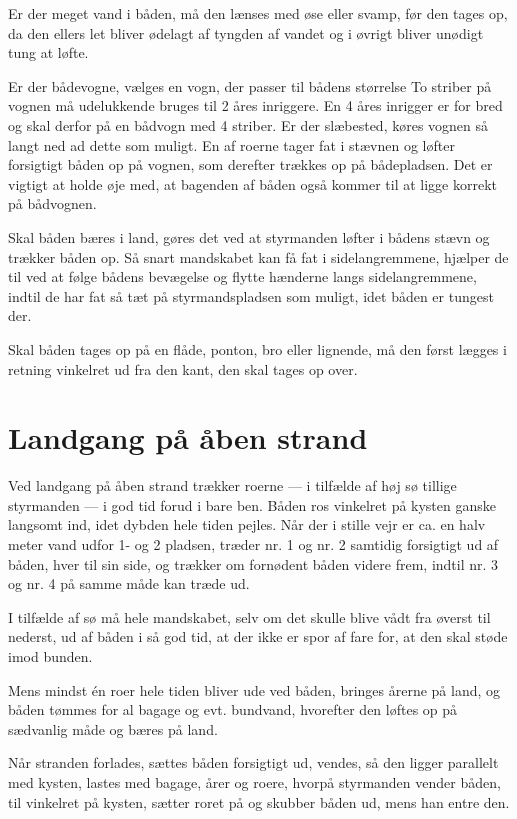 \documentclass{article}
\begin{document}
Er der meget vand i båden, må den lænses med øse eller svamp, før den
tages op, da den ellers let bliver ødelagt af tyngden af vandet og i
øvrigt bliver unødigt tung at løfte.

Er der bådevogne, vælges en vogn, der passer til bådens størrelse To
striber på vognen må udelukkende bruges til 2 åres inriggere. En 4 åres
inrigger er for bred og skal derfor på en bådvogn med 4 striber. Er der
slæbested, køres vognen så langt ned ad dette som muligt. En af roerne
tager fat i stævnen og løfter forsigtigt båden op på vognen, som derefter
trækkes op på bådepladsen. Det er vigtigt at holde øje med, at bagenden
af båden også kommer til at ligge korrekt på bådvognen.

Skal båden bæres i land, gøres det ved at styrmanden løfter i bådens
stævn og trækker båden op. Så snart mandskabet kan få fat i
sidelangremmene, hjælper de til ved at følge bådens bevægelse og flytte
hænderne langs sidelangremmene, indtil de har fat så tæt på
styrmandspladsen som muligt, idet båden er tungest der.

Skal båden tages op på en flåde, ponton, bro eller lignende, må den først
lægges i retning vinkelret ud fra den kant, den skal tages op over.

\section{Landgang på åben strand}

Ved landgang på åben strand trækker roerne --- i tilfælde af høj sø
tillige styrmanden --- i god tid forud i bare ben. Båden ros vinkelret på
kysten ganske langsomt ind, idet dybden hele tiden pejles. Når der i
stille vejr er ca. en halv meter vand udfor 1- og 2 pladsen, træder nr. 1
og nr. 2 samtidig forsigtigt ud af båden, hver til sin side, og trækker
om fornødent båden videre frem, indtil nr. 3 og nr. 4 på samme måde kan
træde ud.

I tilfælde af sø må hele mandskabet, selv om det skulle blive vådt fra
øverst til nederst, ud af båden i så god tid, at der ikke er spor af fare
for, at den skal støde imod bunden.

Mens mindst én roer hele tiden bliver ude ved båden, bringes årerne på
land, og båden tømmes for al bagage og evt. bundvand, hvorefter den
løftes op på sædvanlig måde og bæres på land.

Når stranden forlades, sættes båden forsigtigt ud, vendes, så den ligger
parallelt med kysten, lastes med bagage, årer og roere, hvorpå styrmanden
vender båden, til vinkelret på kysten, sætter roret på og skubber båden
ud, mens han entre den.
\end{document}
